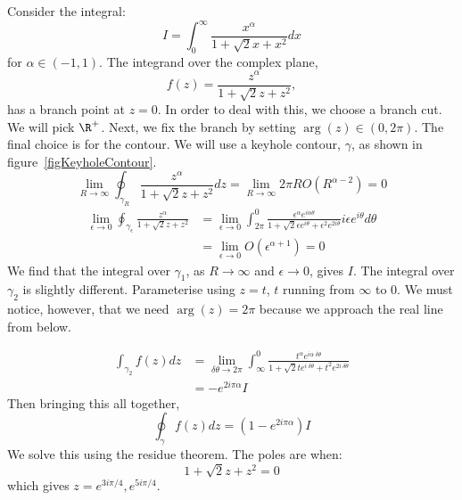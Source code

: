 \documentclass[../Main.tex]{subfiles}
\begin{document}
\begin{example}
    Consider the integral:
    \begin{equation*}
        I = \int_{0}^{\infty} \frac{x^\alpha}{1 + \sqrt2 x + x^2} dx
    \end{equation*}
    for $\alpha \in (-1, 1)$. The integrand over the complex plane,
    \begin{equation*}
        f(z) = \frac{z^\alpha}{1 + \sqrt2z + z^2},
    \end{equation*}
    has a branch point at $z = 0$. In order to deal with this, we choose a branch cut. We will pick $\R^+$. Next, we fix the branch by setting $\arg(z) \in (0, 2\pi)$. The final choice is for the contour. We will use a keyhole contour, $\gamma$, as shown in figure~\ref{figKeyholeContour}.
    \begin{equation*}
        \lim_{R \to \infty} \oint_{\gamma_R} \frac{z^\alpha}{1 + \sqrt2 z + z^2} dz = \lim_{R \to \infty} 2\pi R O(R^{\alpha - 2}) = 0
    \end{equation*}
    \begin{align*}
        \lim_{\epsilon \to 0} \oint_{\gamma_\epsilon} \frac{z^\alpha}{1 + \sqrt2z + z^2} &= \lim_{\epsilon \to 0} \int_{2\pi}^{0} \frac{\epsilon^\alpha e^{i \alpha \theta}}{1 + \sqrt2 \epsilon e^{i\theta} + \epsilon^2 e^{2i\theta}} i \epsilon e^{i\theta} d\theta \\
        &= \lim_{\epsilon \to 0} O(\epsilon^{\alpha + 1}) = 0
    \end{align*}
    We find that the integral over $\gamma_1$, as $R \to \infty$ and $\epsilon \to 0$, gives $I$. The integral over $\gamma_2$ is slightly different. Parameterise using $z = t$, $t$ running from $\infty$ to $0$. We must notice, however, that we need $\arg(z) = 2\pi$ because we approach the real line from below.

    \begin{align*}
        \int_{\gamma_2} f(z) dz &= \lim_{\delta \theta \to 2\pi} \int_\infty^0 \frac{t^\alpha e^{i \alpha~\delta \theta}}{1 + \sqrt2 t e^{i~\delta \theta} + t^2 e^{2i~\delta \theta}} \\
        &= -e^{2i\pi \alpha} I
    \end{align*}
    Then bringing this all together,
    \begin{equation*}
        \oint_\gamma f(z) dz = (1 - e^{2i\pi \alpha})I
    \end{equation*}
    We solve this using the residue theorem. The poles are when:
    \begin{equation*}
        1 + \sqrt2z + z^2 = 0
    \end{equation*}
    which gives $z = e^{3 i \pi / 4}, e^{5 i \pi / 4}$.


\end{example}
\end{document}
